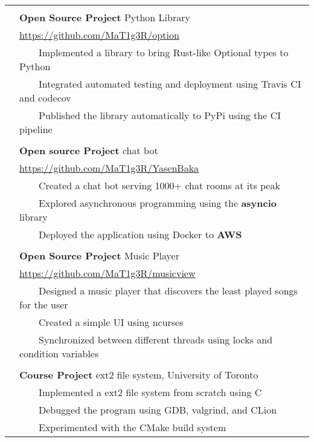 \documentclass[letterpaper,12pt,oneside]{article}
\newcommand{\tabitem}{~~\llap{\textbullet}~~}
\newcommand{\smallurl}[1]{\small{\url{#1}}}
\begin{document}
\begin{longtable}{@{} l p{14cm}}
& \\
& \textbf{Open Source Project} Python Library \\
& \smallurl{https://github.com/MaT1g3R/option} \\
& \tabitem Implemented a library to bring Rust-like Optional types to Python \\
& \tabitem Integrated automated testing and deployment using Travis CI and codecov \\
& \tabitem Published the library automatically to PyPi using the CI pipeline \\
& \\
& \textbf{Open source Project} chat bot \\
& \smallurl{https://github.com/MaT1g3R/YasenBaka} \\
& \tabitem Created a chat bot serving 1000+ chat rooms at its peak \\
& \tabitem Explored asynchronous programming using the \textbf{asyncio} library \\
& \tabitem Deployed the application using Docker to \textbf{AWS} \\
& \\
& \textbf{Open Source Project} Music Player \\
& \smallurl{https://github.com/MaT1g3R/musicview} \\
& \tabitem Designed a music player that discovers the least played songs for the user \\
& \tabitem Created a simple UI using ncurses \\
& \tabitem Synchronized between different threads using locks and condition variables \\
& \\
& \textbf{Course Project} ext2 file system, University of Toronto \\
& \tabitem Implemented a ext2 file system from scratch using C \\
& \tabitem Debugged the program using GDB, valgrind, and CLion \\
& \tabitem Experimented with the CMake build system \\
\end{longtable}
\end{document}
